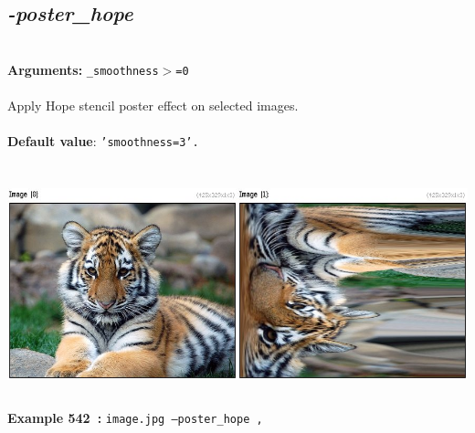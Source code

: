 \documentclass[a4paper,11pt,twoside]{book}
\begin{document}
\subsection{\emph{-poster\_hope} }\vspace*{-0.5em}
~\\\textbf{Arguments: } 
{\small \texttt{\_smoothness$>$=0}}\\~\\
Apply Hope stencil poster effect on selected images.
~\\~\\\textbf{Default value}: {\small \texttt{'smoothness=3'.}}
\begin{center}\includegraphics[keepaspectratio=true,height=7cm,width=\textwidth]{img/gmic_def542.jpg}\\
{\footnotesize \textbf{Example 542~:} \texttt{image.jpg --poster\_hope ,}}
\end{center}
\end{document}
